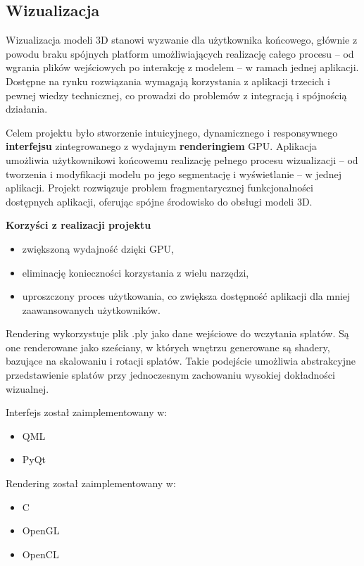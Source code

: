 \subsection{Wizualizacja}
Wizualizacja modeli 3D stanowi wyzwanie dla użytkownika końcowego,
głównie z powodu braku spójnych platform umożliwiających realizację
całego procesu – od wgrania plików wejściowych po interakcję z modelem – w ramach jednej aplikacji.
Dostępne na rynku rozwiązania wymagają korzystania z aplikacji trzecich i pewnej wiedzy technicznej,
co prowadzi do problemów z integracją i spójnością działania.

Celem projektu było stworzenie intuicyjnego, dynamicznego i responsywnego \textbf{interfejsu} zintegrowanego z wydajnym \textbf{renderingiem} GPU.
Aplikacja umożliwia użytkownikowi końcowemu realizację pełnego procesu
wizualizacji – od tworzenia i modyfikacji modelu po jego segmentację i wyświetlanie – w jednej aplikacji.
Projekt rozwiązuje problem fragmentarycznej funkcjonalności dostępnych aplikacji, oferując spójne środowisko do obsługi modeli 3D.

\textbf{Korzyści z realizacji projektu}

\begin{itemize}
    \item zwiększoną wydajność dzięki GPU,
    \item eliminację konieczności korzystania z wielu narzędzi,
    \item uproszczony proces użytkowania, co zwiększa dostępność aplikacji dla mniej zaawansowanych użytkowników.
\end{itemize}

Rendering wykorzystuje plik .ply jako dane wejściowe do wczytania splatów.
Są one renderowane jako sześciany, w których wnętrzu generowane są shadery, bazujące na skalowaniu i rotacji splatów.
Takie podejście umożliwia abstrakcyjne przedstawienie splatów przy jednoczesnym zachowaniu wysokiej dokładności wizualnej.

Interfejs został zaimplementowany w:
\begin{itemize}
    \item QML
    \item PyQt
\end{itemize}

Rendering został zaimplementowany w:
\begin{itemize}
    \item C
    \item OpenGL
    \item OpenCL
\end{itemize}

